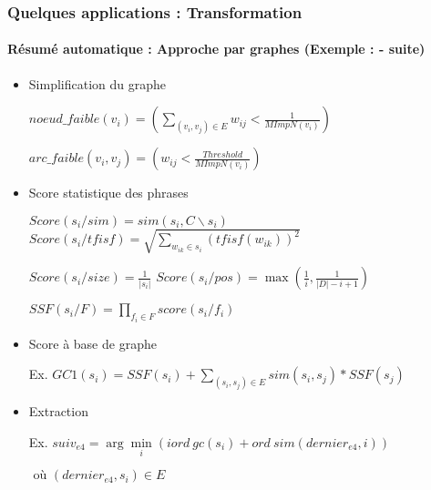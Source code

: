 \documentclass[xcolor=table]{beamer}
\begin{document}
\begin{frame}
	\frametitle{Quelques applications : Transformation}
	\framesubtitle{Résumé automatique : Approche par graphes (Exemple : \cite{21-aries-al} - suite)}
	
	\vspace{-6pt}
	\begin{itemize}
		\item Simplification du graphe
		
		\hspace{.5cm}$noeud\_faible(v_i) = ( \sum_{(v_i, v_j) \in E} w_{ij} < \frac{1}{MImpN(v_i)} )$ 
		
		\hspace{.5cm}$arc\_faible(v_i, v_j) = ( w_{ij} < \frac{Threshold}{MImpN(v_i)})$
		
		\item Score statistique des phrases
		
		\hspace{.5cm}$ Score(s_i/ sim) = sim(s_i, C\backslash s_i) $
		$Score(s_i/ tfisf) = \sqrt{\sum\limits_{w_{ik} \in s_i} (tfisf(w_{ik}))^2}$
		
		\hspace{.5cm}$Score(s_i/ size) = \frac{1}{|s_i|}$
		$Score(s_i/ pos) = \max (\frac{1}{i}, \frac{1}{|D| - i + 1})$
		
		\hspace{.5cm}$SSF(s_i/ F) = \prod_{f_i \in F} score(s_i/f_i)$
		
		\item Score à base de graphe 
		
		\hspace{.5cm}Ex. $GC1(s_i) = SSF(s_i) + \sum\limits_{(s_i, s_j) \in E} sim(s_i, s_j) * SSF(s_j)$
		
		\item Extraction
		
		\hspace{.5cm}Ex. $ suiv_{e4}  =  \arg\min\limits_i (iord\ gc(s_i) + ord\ sim(dernier_{e4}, i))$ 
		
		\hspace{3cm}$ \text{ où } (dernier_{e4}, s_i) \in E $
	\end{itemize}
	
\end{frame}
\end{document}
